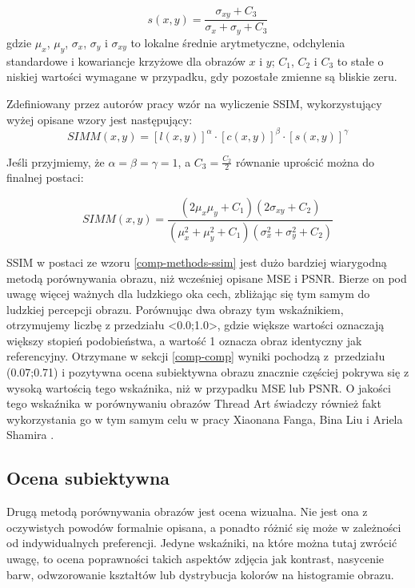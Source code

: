         \begin{equation} \label{comp-methods-s}
           s(x,y)=\frac{\sigma_{xy} + C_3}{\sigma_x + \sigma_y + C_3}
        \end{equation}
        gdzie \(\mu_x\), \(\mu_y\), \(\sigma_x\), \(\sigma_y\) i \(\sigma_{xy}\) to lokalne średnie arytmetyczne, odchylenia standardowe i kowariancje krzyżowe dla obrazów \(x\) i \(y\); \(C_1\), \(C_2\) i \(C_3\) to stałe o niskiej wartości wymagane w przypadku, gdy pozostałe zmienne są bliskie zeru.
        
        Zdefiniowany przez autorów pracy wzór na wyliczenie SSIM, wykorzystujący wyżej opisane wzory jest następujący:
        \begin{equation} \label{comp-methods-ssim-assumed}
           SIMM(x,y)=[l(x,y)]^{\alpha} \cdot [c(x,y)]^{\beta} \cdot [s(x,y)]^{\gamma}
        \end{equation}
        
        Jeśli przyjmiemy, że \(\alpha = \beta = \gamma = 1\), a \(C_3 = \frac{C_2}{2}\) równanie uprościć można do finalnej postaci:
        
        \begin{equation} \label{comp-methods-ssim}
           SIMM(x,y)=\frac{(2\mu_x\mu_y + C_1)(2\sigma_{xy} + C_2)}{(\mu_x^2 + \mu_y^2 + C_1)(\sigma_x^2 + \sigma_y^2 + C_2)}
        \end{equation}
        
        SSIM w postaci ze wzoru \ref{comp-methods-ssim} jest dużo bardziej wiarygodną metodą porównywania obrazu, niż wcześniej opisane MSE i PSNR. Bierze on pod uwagę więcej ważnych dla ludzkiego oka cech, zbliżając się tym samym do ludzkiej percepcji obrazu. Porównując dwa obrazy tym wskaźnikiem, otrzymujemy liczbę z przedziału <0.0;1.0>, gdzie większe wartości oznaczają większy stopień podobieństwa, a wartość 1 oznacza obraz identyczny jak referencyjny. Otrzymane w sekcji \ref{comp-comp} wyniki pochodzą z~przedziału (0.07;0.71) i pozytywna ocena subiektywna obrazu znacznie częściej pokrywa się z wysoką wartością tego wskaźnika, niż w przypadku MSE lub PSNR. O jakości tego wskaźnika w porównywaniu obrazów Thread Art świadczy również fakt wykorzystania go w tym samym celu w pracy Xiaonana Fanga, Bina Liu i Ariela Shamira \cite{article-string-art-xiaonan}.
    
        \subsection{Ocena subiektywna}
        Drugą metodą porównywania obrazów jest ocena wizualna. Nie jest ona z oczywistych powodów formalnie opisana, a ponadto różnić się może w zależności od indywidualnych preferencji. Jedyne wskaźniki, na które można tutaj zwrócić uwagę, to ocena poprawności takich aspektów zdjęcia jak kontrast, nasycenie barw, odwzorowanie kształtów lub dystrybucja kolorów na histogramie obrazu.
        

